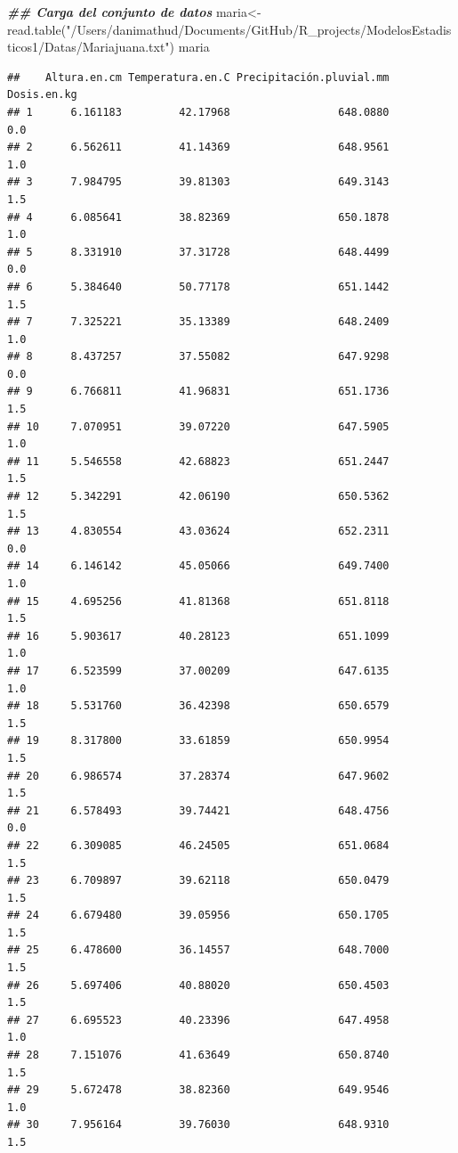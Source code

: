 \documentclass[
]{article}
\newenvironment{Shaded}{\begin{snugshade}}{\end{snugshade}}
\newcommand{\DocumentationTok}[1]{\textcolor[rgb]{0.56,0.35,0.01}{\textbf{\textit{#1}}}}
\newcommand{\FunctionTok}[1]{\textcolor[rgb]{0.00,0.00,0.00}{#1}}
\newcommand{\NormalTok}[1]{#1}
\newcommand{\OtherTok}[1]{\textcolor[rgb]{0.56,0.35,0.01}{#1}}
\newcommand{\StringTok}[1]{\textcolor[rgb]{0.31,0.60,0.02}{#1}}
\begin{document}
\begin{Shaded}
\begin{Highlighting}[]
\DocumentationTok{\#\# Carga del conjunto de datos}
\NormalTok{maria}\OtherTok{\textless{}{-}}\FunctionTok{read.table}\NormalTok{(}\StringTok{"/Users/danimathud/Documents/GitHub/R\_projects/ModelosEstadisticos1/Datas/Mariajuana.txt"}\NormalTok{)}
\NormalTok{maria}
\end{Highlighting}
\end{Shaded}

\begin{verbatim}
##    Altura.en.cm Temperatura.en.C Precipitación.pluvial.mm Dosis.en.kg
## 1      6.161183         42.17968                 648.0880         0.0
## 2      6.562611         41.14369                 648.9561         1.0
## 3      7.984795         39.81303                 649.3143         1.5
## 4      6.085641         38.82369                 650.1878         1.0
## 5      8.331910         37.31728                 648.4499         0.0
## 6      5.384640         50.77178                 651.1442         1.5
## 7      7.325221         35.13389                 648.2409         1.0
## 8      8.437257         37.55082                 647.9298         0.0
## 9      6.766811         41.96831                 651.1736         1.5
## 10     7.070951         39.07220                 647.5905         1.0
## 11     5.546558         42.68823                 651.2447         1.5
## 12     5.342291         42.06190                 650.5362         1.5
## 13     4.830554         43.03624                 652.2311         0.0
## 14     6.146142         45.05066                 649.7400         1.0
## 15     4.695256         41.81368                 651.8118         1.5
## 16     5.903617         40.28123                 651.1099         1.0
## 17     6.523599         37.00209                 647.6135         1.0
## 18     5.531760         36.42398                 650.6579         1.5
## 19     8.317800         33.61859                 650.9954         1.5
## 20     6.986574         37.28374                 647.9602         1.5
## 21     6.578493         39.74421                 648.4756         0.0
## 22     6.309085         46.24505                 651.0684         1.5
## 23     6.709897         39.62118                 650.0479         1.5
## 24     6.679480         39.05956                 650.1705         1.5
## 25     6.478600         36.14557                 648.7000         1.5
## 26     5.697406         40.88020                 650.4503         1.5
## 27     6.695523         40.23396                 647.4958         1.0
## 28     7.151076         41.63649                 650.8740         1.5
## 29     5.672478         38.82360                 649.9546         1.0
## 30     7.956164         39.76030                 648.9310         1.5
\end{verbatim}
\end{document}
